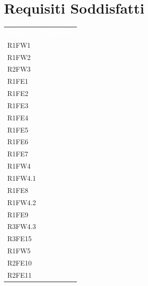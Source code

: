 \section{Requisiti Soddisfatti}

\begin{table}[H]
\renewcommand{\arraystretch}{1.5}
\begin{tabular}[t]{ m{}<{\centering}  m{}<{\centering} }
	\rowcolor{darkblue}
	\textcolor{white}{\textbf{Fonte}} &\textcolor{white}{\textbf{Requisiti}}\\ 

	R1FW1 & \So \\	
	 
	R1FW2 & \So \\	

	R2FW3 & \So \\	
	 
	R1FE1 & \So \\	
	 
	R1FE2 & \So \\	
	 
	R1FE3 & \So \\	

	R1FE4 & \So \\	
	
	R1FE5 & \So \\
	 
	R1FE6 & \So \\	 
	 
	R1FE7 & \So \\	

	R1FW4 & \So \\ 
	 
	R1FW4.1& \Ns \\	
	 
	R1FE8 & \Ns \\	
	 
	R1FW4.2 & \Ns \\		 

	R1FE9 & \Ns \\		
	 
	R3FW4.3 & \So \\				
	 
	R3FE15 & \So \\			
	  	 	 	
	R1FW5 & \So \\		
	
	R2FE10 & \Ns \\
	
	R2FE11 & \Ns \\
	 

\end{tabular}
\end{table}
